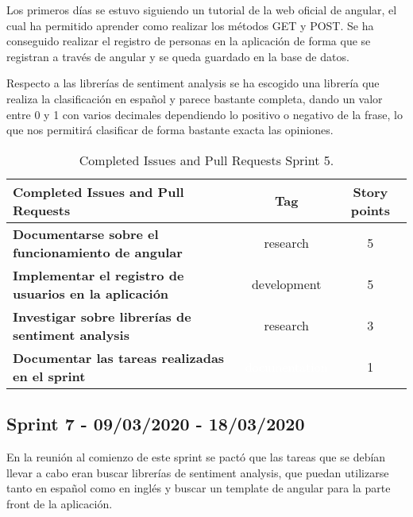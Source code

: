 Los primeros días se estuvo siguiendo un tutorial de la web oficial de angular, el cual ha permitido aprender como realizar los métodos GET y POST.
Se ha conseguido realizar el registro de personas en la aplicación de forma que se registran a través de angular y se queda guardado en la base de datos.

Respecto a las librerías de sentiment analysis se ha escogido una librería que realiza la clasificación en español y parece bastante completa, dando un valor entre 0 y 1 con varios decimales dependiendo lo positivo o negativo de la frase, lo que nos permitirá clasificar de forma bastante exacta las opiniones.


\begin{table}[ht!]
    \centering
    \resizebox{15cm}{!} {
    \begin{tabular}{|l|c|c|}
    \hline
    \rowcolor[rgb]{0.81,0.81,0.77}
    \textbf{Completed Issues and Pull Requests}     &\textbf{Tag}     & \textbf{Story points} \\ \hline
    \textbf{Documentarse sobre el funcionamiento de angular}         &\cellcolor[rgb]{0.6,1.0,0.6}research      &5 \\ \hline 
    \textbf{Implementar el registro de usuarios en la aplicación}         &\cellcolor[rgb]{0.69,0.93,0.93}development      &5 \\ \hline
    \textbf{Investigar sobre librerías de sentiment analysis}         &\cellcolor[rgb]{0.6,1.0,0.6}research      &3 \\ \hline 
    \textbf{Documentar las tareas realizadas en el sprint}         &\cellcolor[rgb]{0.0,0.33,0.71}\textcolor{white}{documentation}      &1 \\ \hline 
    \end{tabular}}
    \caption{Completed Issues and Pull Requests Sprint 5.}
    \label{tab:my_label}
\end{table}
\newpage
\subsection{Sprint 7 - 09/03/2020 - 18/03/2020}
En la reunión al comienzo de este sprint se pactó que las tareas que se debían llevar a cabo eran buscar librerías de sentiment analysis, que puedan utilizarse tanto en español como en inglés y buscar un template de angular para la parte front de la aplicación.

